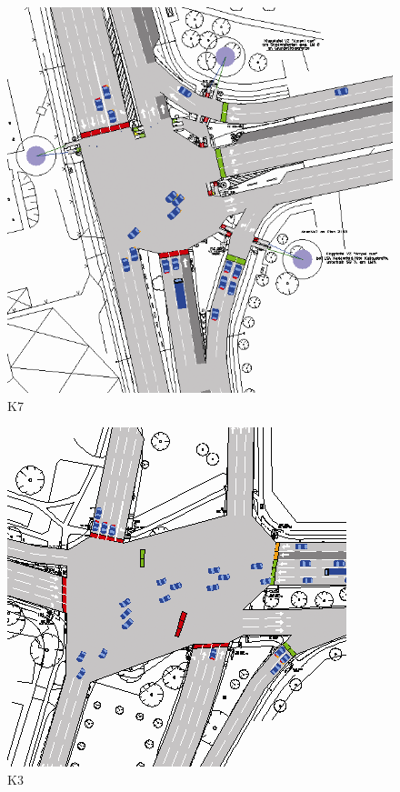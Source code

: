 \begin{figure} [!htb]
	\centering
	\includegraphics[scale=0.45]{pic/K7.png}
	\caption{K7 \cite{organic1}}
	\label{fig:K7}
\end{figure}

\begin{figure} [!htb]
	\centering
	\includegraphics[scale=0.70]{pic/K3.png}
	\caption{K3 \cite{organic1}}
	\label{fig:K3}
\end{figure}

